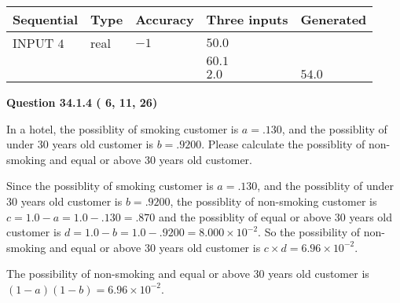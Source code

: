\documentclass[12pt]{article}
\begin{document}
   
  
  
\noindent\begin{tabular}{|l|l|l|l|l|}
\hline
 Sequential & Type & Accuracy & Three inputs & Generated \\ 
\hline
 
 
  INPUT $           4$ & real & $          -1 $ & $
 50.0
  $ & \\
  & & &  $
 60.1
  $ & \\
  & & &  $
 2.0
 $ & $ 54.0 $ 
 \\  \hline  
 \end{tabular}
   
   
  
\vspace{0.2in}
  
{\textbf{\Large{Question
34.1.4 
 (          6,         11,         26)
}}}
  
  
In a hotel, the possiblity of  %
smoking customer is
$a =  %
.130$, and the possiblity of  %
 under 30 years old customer is $ b =  %
.9200$.
Please calculate the possiblity of  %
 non-smoking and  %
equal or above 30 years old customer.
 
 
 
\noindent{}
 
 

Since the possiblity of  %
smoking customer is $ a =  %
.130 $,
and the possiblity of  %
 under 30 years old customer is $ b =  %
.9200 $,
the possiblity of  %
non-smoking customer is $ c = 1.0 - a = 1.0 -
.130
=  %
.870 $ and the possiblity of  %
equal or above 30 years old
customer is $ d = 1.0 - b = 1.0 -  %
.9200 =  %
8.000 \times 10^{-2}  $.
So the possibility of  %
 non-smoking and  %
equal or above 30 years old
customer is $ c \times d =  %
6.96 \times 10^{-2} $.
 
 
 
\noindent{}
 
 

 
 
 
\noindent{}
 
 

The possibility of  %
 non-smoking and  %
equal or above 30 years old
customer is $ (1-a)(1-b) =  %
6.96 \times 10^{-2} $.
 
 
\noindent{}
 
\end{document}
